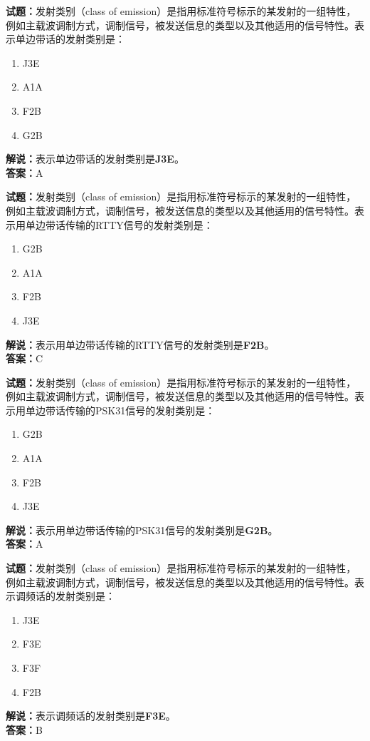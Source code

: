 \documentclass{ctexbook}
\begin{document}
\noindent\textbf{试题：}发射类别（class of emission）是指用标准符号标示的某发射的一组特性，例如主载波调制方式，调制信号，被发送信息的类型以及其他适用的信号特性。表示单边带话的发射类别是：
\begin{enumerate}[leftmargin=3em]
\item J3E
\item A1A
\item F2B
\item G2B
\end{enumerate}
\noindent\textbf{解说：}表示单边带话的发射类别是\textbf{J3E}。\\\noindent\textbf{答案：}A



\bigskip


\noindent\textbf{试题：}发射类别（class of emission）是指用标准符号标示的某发射的一组特性，例如主载波调制方式，调制信号，被发送信息的类型以及其他适用的信号特性。表示用单边带话传输的RTTY信号的发射类别是：
\begin{enumerate}[leftmargin=3em]
\item G2B
\item A1A
\item F2B
\item J3E
\end{enumerate}
\noindent\textbf{解说：}表示用单边带话传输的RTTY信号的发射类别是\textbf{F2B}。\\\noindent\textbf{答案：}C


\bigskip


\noindent\textbf{试题：}发射类别（class of emission）是指用标准符号标示的某发射的一组特性，例如主载波调制方式，调制信号，被发送信息的类型以及其他适用的信号特性。表示用单边带话传输的PSK31信号的发射类别是：
\begin{enumerate}[leftmargin=3em]
\item G2B
\item A1A
\item F2B
\item J3E
\end{enumerate}
\noindent\textbf{解说：}表示用单边带话传输的PSK31信号的发射类别是\textbf{G2B}。\\\noindent\textbf{答案：}A



\bigskip


\noindent\textbf{试题：}发射类别（class of emission）是指用标准符号标示的某发射的一组特性，例如主载波调制方式，调制信号，被发送信息的类型以及其他适用的信号特性。表示调频话的发射类别是：
\begin{enumerate}[leftmargin=3em]
\item J3E
\item F3E
\item F3F
\item F2B
\end{enumerate}
\noindent\textbf{解说：}表示调频话的发射类别是\textbf{F3E}。\\\noindent\textbf{答案：}B
\end{document}
